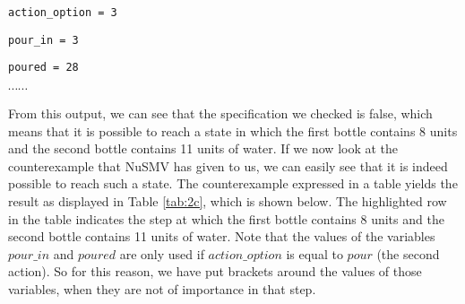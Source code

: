 \documentclass[a4paper]{article}
\begin{document}
{\tt     action\_option = 3 }

{\tt     pour\_in = 3 }

{\tt     poured = 28 }

$\cdots \cdots$

From this output, we can see that the specification we checked is false, which means that it is possible to reach a state in which the first bottle contains 8 units and the second bottle contains 11 units of water. If we now look at the counterexample that NuSMV has given to us, we can easily see that it is indeed possible to reach such a state. The counterexample expressed in a table yields the result as displayed in Table \ref{tab:2c}, which is shown below. The highlighted row in the table indicates the step at which the first bottle contains 8 units and the second bottle contains 11 units of water. Note that the values of the variables $pour\_in$ and $poured$ are only used if $action\_option$ is equal to $pour$ (the second action). So for this reason, we have put brackets around the values of those variables, when they are not of importance in that step.
\end{document}
